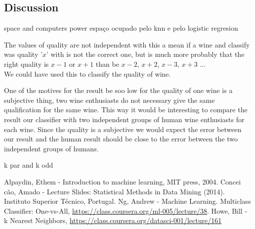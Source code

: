 \documentclass[twoside]{article}
\begin{document}
\begin{multicols}{2}
\section{Discussion}

space and computers power
espaço ocupado pelo knn e pelo logistic regresion

The values of quality are not independent with this a mean if a wine and classify was quality '$x$' with is not the correct one, but is much more probably that the right quality is $x-1$ or $x+1$ than be $x-2$, $x+2$, $x-3$, $x+3$ ... \\
We could have used this to classify the quality of wine.


One of the motives for the result be soo low for the quality of one wine is a subjective thing, two wine enthusiasts do not necessary give the same qualification for the same wine. This way it would be interesting to compare the result our classifier with two independent groups of human wine enthusiasts for each wine. Since the quality is a subjective we would expect the error between our result and the human result should be close to the error between the two independent groups of humans.





k par and k odd 


%
%


{}
\begin{thebibliography}{}	
  Alpaydin, Ethem -   
  Introduction to machine learning, 
  MIT press,
  2004.
  Concei\,{c}\~{a}o, Amado -
  Lecture Slides: Statistical Methods in Data Mining (2014). Instituto Superior Técnico, Portugal.  
  Ng, Andrew - 
  Machine Learning. Multiclass Classifier: One-vs-All,
  \url{https://class.coursera.org/ml-005/lecture/38}.
  Howe, Bill - 
  k Nearest Neighbors,
  \url{https://class.coursera.org/datasci-001/lecture/161}

  
\end{thebibliography}
\end{multicols}
\newpage
\end{document}
